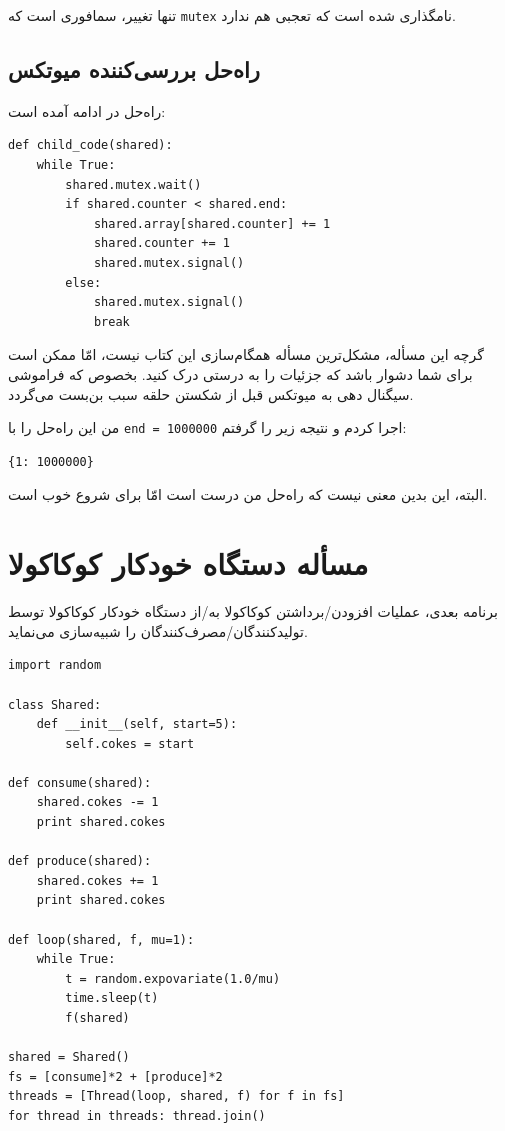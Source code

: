 \documentclass{book}
\newcommand{\clearemptydoublepage}{}%
\begin{document}
    تنها تغییر،  سمافوری است که {\tt mutex} نامگذاری شده است که تعجبی هم ندارد. 

\clearemptydoublepage
\subsection{راه‌حل بررسی‌کننده میوتکس}

    راه‌حل در ادامه آمده است:

\begin{latin}
\begin{lstlisting}
def child_code(shared):
    while True:
        shared.mutex.wait()
        if shared.counter < shared.end:
            shared.array[shared.counter] += 1
            shared.counter += 1
            shared.mutex.signal()
        else:
            shared.mutex.signal()
            break
\end{lstlisting}
\end{latin}

    گرچه این مسأله، مشکل‌ترین مسأله همگام‌سازی این کتاب نیست، امّا ممکن است برای شما دشوار باشد که جزئیات را به درستی درک کنید. 
    بخصوص که فراموشی سیگنال دهی به میوتکس قبل از شکستن حلقه سبب بن‌بست می‌گردد. 

    من این راه‌حل را با  {\tt end = 1000000} اجرا کردم و نتیجه زیر را گرفتم: 
\begin{latin}
\begin{verbatim}
{1: 1000000}
\end{verbatim}
\end{latin}

    البته، این بدین معنی نیست که راه‌حل من درست است امّا برای شروع خوب است. 
    

\clearemptydoublepage
\section {مسأله دستگاه خودکار کوکاکولا}

    برنامه بعدی، عملیات افزودن/برداشتن  کوکاکولا به/از دستگاه خودکار کوکاکولا توسط تولیدکنندگان/مصرف‌کنندگان را شبیه‌سازی می‌نماید. 

\begin{latin}
\begin{lstlisting}
import random

class Shared:
    def __init__(self, start=5):
        self.cokes = start

def consume(shared):
    shared.cokes -= 1
    print shared.cokes

def produce(shared):
    shared.cokes += 1
    print shared.cokes

def loop(shared, f, mu=1):
    while True:
        t = random.expovariate(1.0/mu)
        time.sleep(t)
        f(shared)

shared = Shared()
fs = [consume]*2 + [produce]*2 
threads = [Thread(loop, shared, f) for f in fs]
for thread in threads: thread.join()
\end{lstlisting}
\end{latin}
\end{document}
